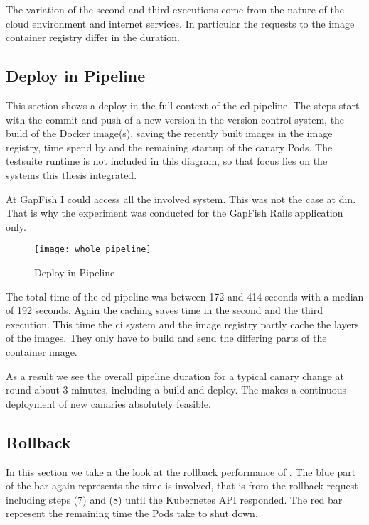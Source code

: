 The variation of the second and third executions come from the nature of the cloud
environment and internet services. In particular the requests to the image container
registry differ in the duration.

\subsection{Deploy in Pipeline}

This section shows a deploy in the full context of the \gls{cd} pipeline. The steps start
with the commit and push of a new version in the version control system, the build of the
Docker image(s), saving the recently built images in the image registry, time spend by
\deployer and the remaining startup of the canary Pods. The testsuite runtime is not
included in this diagram, so that focus lies on the systems this thesis integrated.

At GapFish I could access all the involved system. This was not the case at \gls{din}. That is
why the experiment was conducted for the GapFish Rails application only.

\begin{figure}[htbp]
  \centering
  \texttt{[image: whole\_pipeline]}
  \caption{Deploy in Pipeline}
  \label{fig:whole pipeline}
\end{figure}

The total time of the \gls{cd} pipeline was between 172 and 414 seconds with a median of
192 seconds. Again the caching saves time in the second and the third execution. This time
the \gls{ci} system and the image registry partly cache the layers of the images. They
only have to build and send the differing parts of the container image.

As a result we see the overall pipeline duration for a typical canary change at round
about 3 minutes, including a build and deploy. The makes a continuous deployment of
new canaries absolutely feasible.

\subsection{Rollback}

In this section we take a the look at the rollback performance of \deployer. The blue part
of the bar again represents the time \deployer is involved, that is from the rollback
request including steps (7) and (8) until the Kubernetes API responded. The red bar
represent the remaining time the Pods take to shut down.

